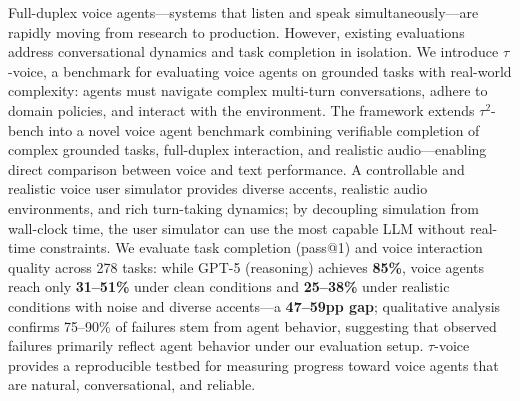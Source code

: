 
Full-duplex voice agents—systems that listen and speak simultaneously—are rapidly moving from research to production. However, existing evaluations address conversational dynamics and task completion in isolation. We introduce $\tau$-voice, a benchmark for evaluating voice agents on grounded tasks with real-world complexity: agents must navigate complex multi-turn conversations, adhere to domain policies, and interact with the environment. The framework extends $\tau^2$-bench into a novel voice agent benchmark combining verifiable completion of complex grounded tasks, full-duplex interaction, and realistic audio—enabling direct comparison between voice and text performance. A controllable and realistic voice user simulator provides diverse accents, realistic audio environments, and rich turn-taking dynamics; by decoupling simulation from wall-clock time, the user simulator can use the most capable LLM without real-time constraints. We evaluate task completion (pass@1) and voice interaction quality across 278 tasks: while GPT-5 (reasoning) achieves \textbf{85\%}, voice agents reach only \textbf{31--51\%} under clean conditions and \textbf{25--38\%} under realistic conditions with noise and diverse accents—a \textbf{47--59pp gap}; qualitative analysis confirms 75--90\% of failures stem from agent behavior, suggesting that observed failures primarily reflect agent behavior under our evaluation setup. $\tau$-voice provides a reproducible testbed for measuring progress toward voice agents that are natural, conversational, and reliable.


